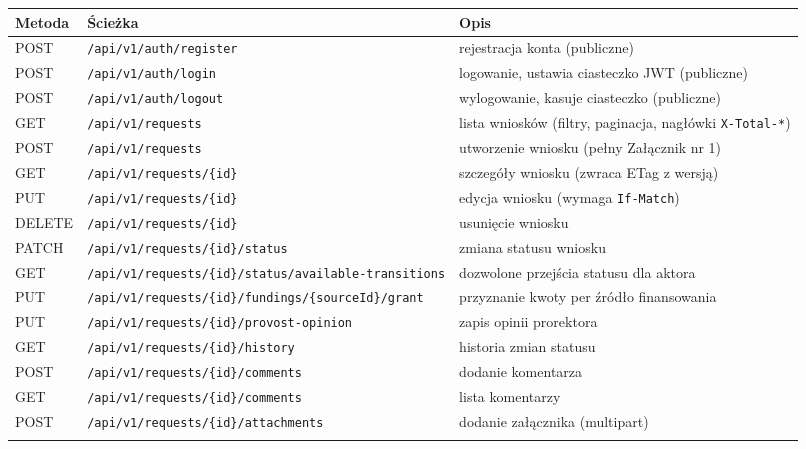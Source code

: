 \documentclass[12pt,a4paper]{article}
\begin{document}
\begin{longtable}{@{}l >{\raggedright\arraybackslash}p{} >{\raggedright\arraybackslash}p{}@{}}
  \toprule
  \textbf{Metoda} & \textbf{Ścieżka} & \textbf{Opis} \\
  \midrule
  \endhead
  \bottomrule
  \endlastfoot
  POST & \nolinkurl{/api/v1/auth/register} & \small{rejestracja konta (publiczne)} \\ \addlinespace
  POST & \nolinkurl{/api/v1/auth/login} & \small{logowanie, ustawia ciasteczko JWT (publiczne)} \\ \addlinespace
  POST & \nolinkurl{/api/v1/auth/logout} & \small{wylogowanie, kasuje ciasteczko (publiczne)} \\
  \midrule
  GET & \nolinkurl{/api/v1/requests} & \small{lista wniosków (filtry, paginacja, nagłówki \texttt{X-Total-*})} \\ \addlinespace
  POST & \nolinkurl{/api/v1/requests} & \small{utworzenie wniosku (pełny Załącznik nr 1)} \\ \addlinespace
  GET & \nolinkurl{/api/v1/requests/{id}} & \small{szczegóły wniosku (zwraca ETag z wersją)} \\ \addlinespace
  PUT & \nolinkurl{/api/v1/requests/{id}} & \small{edycja wniosku (wymaga \texttt{If-Match})} \\ \addlinespace
  DELETE & \nolinkurl{/api/v1/requests/{id}} & \small{usunięcie wniosku} \\ \addlinespace
  PATCH & \nolinkurl{/api/v1/requests/{id}/status} & \small{zmiana statusu wniosku} \\ \addlinespace
  GET & \nolinkurl{/api/v1/requests/{id}/status/available-transitions} & \small{dozwolone przejścia statusu dla aktora} \\ \addlinespace
  PUT & \nolinkurl{/api/v1/requests/{id}/fundings/{sourceId}/grant} & \small{przyznanie kwoty per źródło finansowania} \\ \addlinespace
  PUT & \nolinkurl{/api/v1/requests/{id}/provost-opinion} & \small{zapis opinii prorektora} \\ \addlinespace
  GET & \nolinkurl{/api/v1/requests/{id}/history} & \small{historia zmian statusu} \\ \addlinespace
  POST & \nolinkurl{/api/v1/requests/{id}/comments} & \small{dodanie komentarza} \\ \addlinespace
  GET & \nolinkurl{/api/v1/requests/{id}/comments} & \small{lista komentarzy} \\ \addlinespace
  POST & \nolinkurl{/api/v1/requests/{id}/attachments} & \small{dodanie załącznika (multipart)} \\ \addlinespace

\end{longtable}
\end{document}
